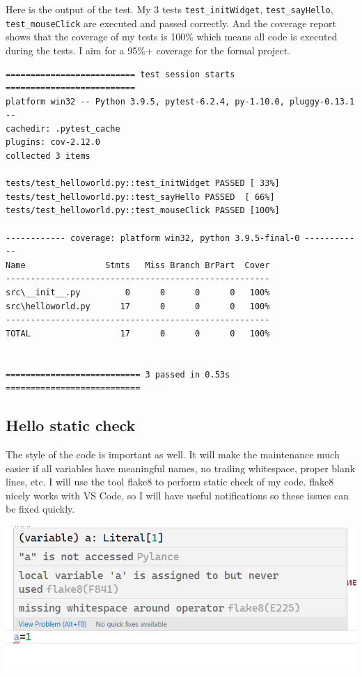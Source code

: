 \documentclass{report}
\begin{document}
Here is the output of the test. My 3 tests \texttt{test_initWidget}, \texttt{test_sayHello}, \texttt{test_mouseClick} are executed and passed correctly. And the coverage report shows that the coverage of my tests is 100\% which means all code is executed during the tests. I aim for a 95\%+ coverage for the formal project.

\begin{verbatim}
========================== test session starts ==========================
platform win32 -- Python 3.9.5, pytest-6.2.4, py-1.10.0, pluggy-0.13.1 --
cachedir: .pytest_cache
plugins: cov-2.12.0
collected 3 items

tests/test_helloworld.py::test_initWidget PASSED [ 33%]
tests/test_helloworld.py::test_sayHello PASSED  [ 66%]
tests/test_helloworld.py::test_mouseClick PASSED [100%]

------------ coverage: platform win32, python 3.9.5-final-0 ------------
Name                Stmts   Miss Branch BrPart  Cover
-----------------------------------------------------
src\__init__.py         0      0      0      0   100%
src\helloworld.py      17      0      0      0   100%
-----------------------------------------------------
TOTAL                  17      0      0      0   100%


=========================== 3 passed in 0.53s ===========================
\end{verbatim}

\subsection{Hello static check}

The style of the code is important as well. It will make the maintenance much easier if all variables have meaningful names, no trailing whitespace, proper blank lines, etc. I will use the tool flake8 to perform static check of my code. flake8 nicely works with VS Code, so I will have useful notifications so these issues can be fixed quickly.

\includegraphics[width=\linewidth]{flake8.png}
\end{document}
